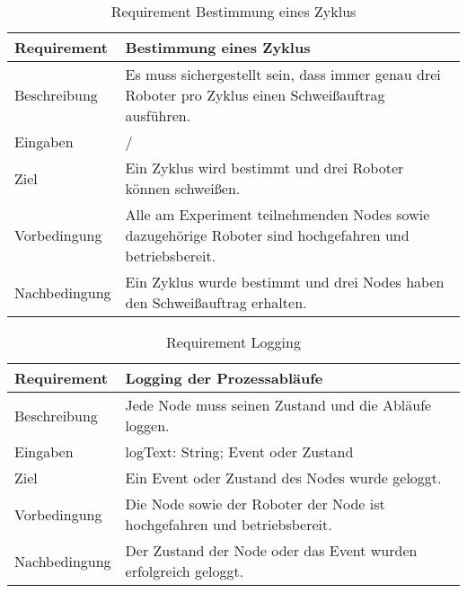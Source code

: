 \begin{table}[h!]
\begin{center}
\begin{tabular}{ |p{2.5cm}|p{11cm}| } 
 \hline
 Requirement & Bestimmung eines Zyklus \\
 \hline
 Beschreibung & Es muss sichergestellt sein, dass immer genau drei Roboter pro Zyklus einen
 Schweißauftrag ausführen. \\
 \hline
 Eingaben & / \\
 \hline
 Ziel & Ein Zyklus wird bestimmt und drei Roboter können schweißen. \\
 \hline
 Vorbedingung & Alle am Experiment teilnehmenden Nodes sowie dazugehörige Roboter sind
 hochgefahren und betriebsbereit. \\
 \hline
 Nachbedingung & Ein Zyklus wurde bestimmt und drei Nodes haben den Schweißauftrag erhalten. \\
 \hline
\end{tabular}
\caption{Requirement Bestimmung eines Zyklus}
\label{table:reqchoosecycle}
\end{center}
\end{table}

\begin{table}[h!]
\begin{center}
\begin{tabular}{ |p{2.5cm}|p{11cm}| } 
 \hline
 Requirement & Logging der Prozessabläufe \\
 \hline
 Beschreibung & Jede Node muss seinen Zustand und die Abläufe loggen. \\
 \hline
 Eingaben & logText: String; Event oder Zustand \\
 \hline
 Ziel & Ein Event oder Zustand des Nodes wurde geloggt. \\
 \hline
 Vorbedingung & Die Node sowie der Roboter der Node ist hochgefahren und betriebsbereit. \\
 \hline
 Nachbedingung & Der Zustand der Node oder das Event wurden erfolgreich geloggt. \\
 \hline
\end{tabular}
\caption{Requirement Logging}
\label{table:reqlogging}
\end{center}
\end{table}

